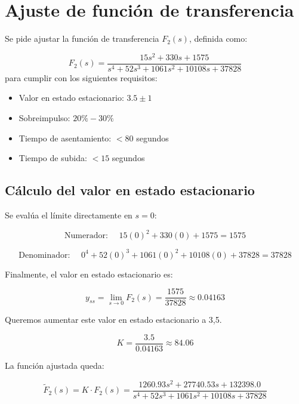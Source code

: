 \documentclass[11pt,letterpaper]{article}
\begin{document}
\section{Ajuste de función de transferencia}
Se pide ajustar la función de transferencia \( F_2(s) \), definida como:

\begin{equation}
F_2(s) = \frac{15s^2 + 330s + 1575}{s^4 + 52s^3 + 1061s^2 + 10108s + 37828}
\end{equation}
para cumplir con los siguientes requisitos:
\begin{itemize}
    \item Valor en estado estacionario: \( 3.5 \pm 1 \)
    \item Sobreimpulso: \( 20\% - 30\% \)
    \item Tiempo de asentamiento: \( < 80 \) segundos
    \item Tiempo de subida: \( < 15 \) segundos
\end{itemize}

\subsection{Cálculo del valor en estado estacionario}

Se evalúa el límite directamente en \( s = 0 \):

\begin{equation}
\text{Numerador: } \quad 15(0)^2 + 330(0) + 1575 = 1575
\end{equation}

\begin{equation}
\text{Denominador: } \quad 0^4 + 52(0)^3 + 1061(0)^2 + 10108(0) + 37828 = 37828
\end{equation}

Finalmente, el valor en estado estacionario es:

\begin{equation}
y_{ss} = \lim_{s \to 0} F_2(s) = \frac{1575}{37828} \approx 0.04163
\end{equation}

Queremos aumentar este valor en estado estacionario a 3,5.

\begin{equation}
K = \frac{3.5}{0.04163} \approx 84.06
\end{equation}

La función ajustada queda:

\begin{equation}
\tilde{F}_2(s) = K \cdot F_2(s) = \frac{1260.93 s^2 + 27740.53 s + 132398.0}{s^4 + 52s^3 + 1061s^2 + 10108s + 37828}
\end{equation}
\end{document}
